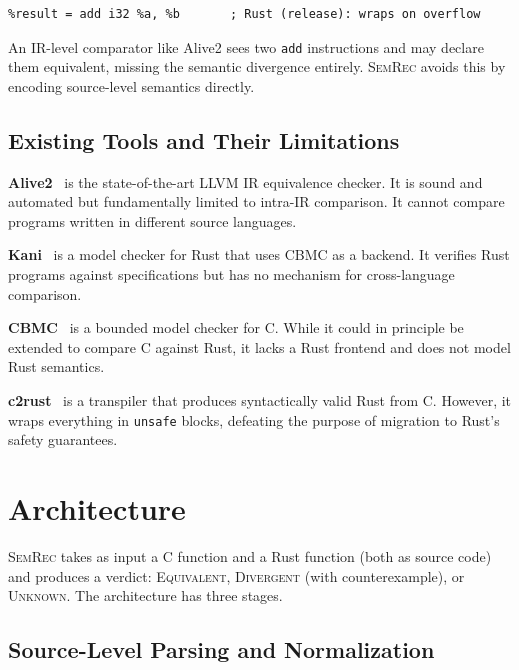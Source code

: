 \documentclass[10pt,letterpaper]{article}
\begin{document}
\begin{lstlisting}[language={},caption={LLVM IR for C and Rust signed addition},label={lst:ir}]
%result = add nsw i32 %a, %b   ; C: assumes no overflow (UB)
%result = add i32 %a, %b       ; Rust (release): wraps on overflow
\end{lstlisting}

An IR-level comparator like Alive2 sees two \texttt{add} instructions and may declare
them equivalent, missing the semantic divergence entirely. \textsc{SemRec} avoids this
by encoding source-level semantics directly.

\subsection{Existing Tools and Their Limitations}

\textbf{Alive2}~\cite{alive2} is the state-of-the-art LLVM IR equivalence checker.
It is sound and automated but fundamentally limited to intra-IR comparison. It cannot
compare programs written in different source languages.

\textbf{Kani}~\cite{kani} is a model checker for Rust that uses CBMC as a backend.
It verifies Rust programs against specifications but has no mechanism for cross-language
comparison.

\textbf{CBMC}~\cite{cbmc} is a bounded model checker for C. While it could in principle
be extended to compare C against Rust, it lacks a Rust frontend and does not model Rust
semantics.

\textbf{c2rust}~\cite{c2rust} is a transpiler that produces syntactically valid Rust
from C. However, it wraps everything in \texttt{unsafe} blocks, defeating the purpose
of migration to Rust's safety guarantees.

\section{Architecture}
\label{sec:architecture}

\textsc{SemRec} takes as input a C function and a Rust function (both as source code)
and produces a verdict: \textsc{Equivalent}, \textsc{Divergent} (with counterexample),
or \textsc{Unknown}. The architecture has three stages.

\subsection{Source-Level Parsing and Normalization}
\end{document}
